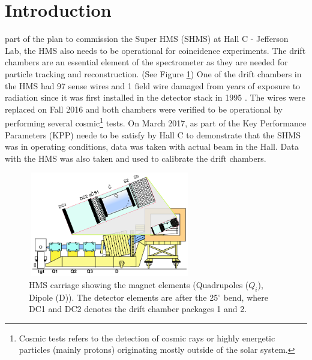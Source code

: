 \documentclass[journal, a4paper]{IEEEtran}
\begin{document}
\section{Introduction}
 part of the plan to commission the Super HMS (SHMS) at Hall C - Jefferson Lab, the
HMS also needs to be operational for coincidence experiments. The drift chambers are an essential element
of the spectrometer as they are needed for particle tracking and reconstruction. (See Figure \ref{fig:HMS_carriage}) One of the drift chambers
in the HMS had 97 sense wires and 1 field wire damaged from years of exposure to radiation since it was first
installed in the detector stack in 1995 \cite{baker}. The  wires were replaced on Fall 2016 and both chambers
were verified to be operational by performing several cosmic\footnote{Cosmic tests refers to the detection of cosmic rays or highly energetic particles (mainly
protons) originating mostly outside of the solar system.} tests. On March 2017, as part of the Key Performance Parameters (KPP)
neede to be satisfy by Hall C to demonstrate that the SHMS was in operating conditions, data was taken with actual beam in the
Hall. Data with the HMS was also taken and used to calibrate the drift chambers.
\begin{figure}[h]
  \centering
  \includegraphics[width=2.8in, height=1.8in]{HMS_Carriage.png}
  \caption{HMS carriage showing the magnet elements (Quadrupoles ($Q_{i}$), Dipole (D)). The detector elements are
  after the 25$^{\circ}$ bend, where DC1 and DC2 denotes the drift chamber
  packages 1 and 2.}
  \label{fig:HMS_carriage}
\end{figure}
\end{document}

